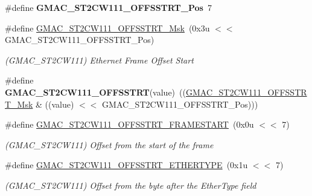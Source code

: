\begin{DoxyCompactItemize}
\item 
\mbox{\label{group__SAMV71__GMAC_ga732f39d933d1f523e1a739ffe994c421}} 
\#define {\bfseries G\+M\+A\+C\+\_\+\+S\+T2\+C\+W111\+\_\+\+O\+F\+F\+S\+S\+T\+R\+T\+\_\+\+Pos}~7
\item 
\mbox{\label{group__SAMV71__GMAC_ga5f71093eb8dd8583a2dad043a22f8143}} 
\#define \mbox{\hyperlink{group__SAMV71__GMAC_ga5f71093eb8dd8583a2dad043a22f8143}{G\+M\+A\+C\+\_\+\+S\+T2\+C\+W111\+\_\+\+O\+F\+F\+S\+S\+T\+R\+T\+\_\+\+Msk}}~(0x3u $<$$<$ G\+M\+A\+C\+\_\+\+S\+T2\+C\+W111\+\_\+\+O\+F\+F\+S\+S\+T\+R\+T\+\_\+\+Pos)
\begin{DoxyCompactList}\small\item\em (G\+M\+A\+C\+\_\+\+S\+T2\+C\+W111) Ethernet Frame Offset Start \end{DoxyCompactList}\item 
\mbox{\label{group__SAMV71__GMAC_ga6ce78628ad9ba6feff8668e22042d2c4}} 
\#define {\bfseries G\+M\+A\+C\+\_\+\+S\+T2\+C\+W111\+\_\+\+O\+F\+F\+S\+S\+T\+RT}(value)~((\mbox{\hyperlink{group__SAMV71__GMAC_ga5f71093eb8dd8583a2dad043a22f8143}{G\+M\+A\+C\+\_\+\+S\+T2\+C\+W111\+\_\+\+O\+F\+F\+S\+S\+T\+R\+T\+\_\+\+Msk}} \& ((value) $<$$<$ G\+M\+A\+C\+\_\+\+S\+T2\+C\+W111\+\_\+\+O\+F\+F\+S\+S\+T\+R\+T\+\_\+\+Pos)))
\item 
\mbox{\label{group__SAMV71__GMAC_ga20dae1cf88af1d373d73faa5687f2352}} 
\#define \mbox{\hyperlink{group__SAMV71__GMAC_ga20dae1cf88af1d373d73faa5687f2352}{G\+M\+A\+C\+\_\+\+S\+T2\+C\+W111\+\_\+\+O\+F\+F\+S\+S\+T\+R\+T\+\_\+\+F\+R\+A\+M\+E\+S\+T\+A\+RT}}~(0x0u $<$$<$ 7)
\begin{DoxyCompactList}\small\item\em (G\+M\+A\+C\+\_\+\+S\+T2\+C\+W111) Offset from the start of the frame \end{DoxyCompactList}\item 
\mbox{\label{group__SAMV71__GMAC_ga4c2a089c4508920190c52a422df1fbe2}} 
\#define \mbox{\hyperlink{group__SAMV71__GMAC_ga4c2a089c4508920190c52a422df1fbe2}{G\+M\+A\+C\+\_\+\+S\+T2\+C\+W111\+\_\+\+O\+F\+F\+S\+S\+T\+R\+T\+\_\+\+E\+T\+H\+E\+R\+T\+Y\+PE}}~(0x1u $<$$<$ 7)
\begin{DoxyCompactList}\small\item\em (G\+M\+A\+C\+\_\+\+S\+T2\+C\+W111) Offset from the byte after the Ether\+Type field \end{DoxyCompactList}\item 

\end{DoxyCompactItemize}
